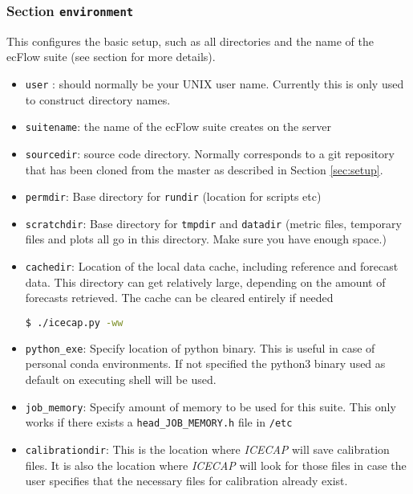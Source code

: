 \documentclass[DIV=10, parskip=full]{scrreprt}
\newcommand{\ice}{\textit{ICECAP}\xspace}
\begin{document}
\subsubsection{Section \texttt{environment}} \label{sec:environment}
This configures the basic setup, such as all directories and the name of the ecFlow suite (see section \label{sec:eflow} for more details).
\begin{itemize}
	\item \texttt{user} : should normally be your UNIX user name. Currently this is only used to construct directory names.
	\item \texttt{suitename}: the name of the ecFlow suite creates on the server 
	\item \texttt{sourcedir}: source code directory. Normally corresponds to a git repository that has been cloned from the master as described in Section \ref{sec:setup}.
	\item \texttt{permdir}: Base directory for \texttt{rundir} (location for scripts etc) 
	\item \texttt{scratchdir}: Base directory for \texttt{tmpdir} and  \texttt{datadir} (metric files, temporary files and plots all go in this directory. Make sure you have enough space.) 
	   \item \texttt{cachedir}: Location of the local data cache, including reference and forecast data. This directory can get relatively large, depending on the amount of forecasts retrieved. The cache can be cleared entirely if needed 
	   \begin{lstlisting}[language=bash]
	   	$ ./icecap.py -ww
	   \end{lstlisting}
	   \item \texttt{python\_exe}: Specify location of python binary. This is useful in case of personal conda environments. If not specified the python3 binary used as default on executing shell will be used.
	  \item \texttt{job\_memory}: Specify amount of memory to be used for this suite. This only works if there exists a \texttt{head\_JOB\_MEMORY.h} file in \texttt{/etc}
	  \item \texttt{calibrationdir}: This is the location where \ice will save calibration files. It is also the location where \ice will look for those files in case the user specifies that the necessary files for calibration already exist.
\end{itemize}
	
\end{document}
